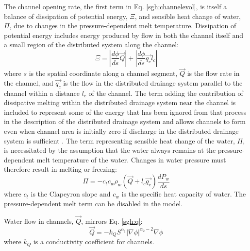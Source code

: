 The channel opening rate, the first term in Eq. \ref{sgh:channelevol}, 
is itself a balance of dissipation of potential energy, $\Xi$, 
and sensible heat change of water, $\Pi$, due to changes in the pressure-dependent melt temperature.
Dissipation of potential energy includes energy produced by flow in both the channel itself 
and a small region of the distributed system along the channel:
\begin{equation}
   \Xi = \left| \frac{d\phi}{ds}\vec{Q} \right|  +  \left| \frac{d\phi}{ds}\vec{q_c} l_c \right| 
\label{sgh:channeldissip}
\end{equation}
where $s$ is the spatial coordinate along a channel segment, 
$\vec{Q}$ is the flow rate in the channel, and
$\vec{q_c}$ is the flow in the distributed drainage system parallel to the channel
within a distance $l_c$ of the channel.
The term adding the contribution of dissipative melting within the distributed drainage system
near the channel is included to represent some of the energy that has been ignored from that process 
in the description of the distributed drainage system 
and allows channels to form even when channel area is initially zero 
if discharge in the distributed drainage system is sufficient \citep{Werder2013}.
The term representing sensible heat change of the water, $\Pi$, is necessitated by the 
assumption that the water always remains at the pressure-dependent melt temperature
of the water.
Changes in water pressure must therefore result in melting or freezing:
\begin{equation}
   \Pi = -c_t c_w \rho_w \left(\vec{Q} + l_c \vec{q_c} \right) \frac{d P_w}{d s} 
\label{sgh:channelfreeze}
\end{equation}
where $c_t$ is the Clapeyron slope and $c_w$ is the specific heat capacity of water.
The pressure-dependent melt term can be disabled in the model.

Water flow in channels, $\vec{Q}$, mirrors Eq. \ref{sgh:q}:
\begin{equation}
   \vec{Q} = -k_Q S^{\alpha_1} |\nabla \phi|^{\alpha_2-2} \nabla \phi 
\label{sgh:Q}
\end{equation}
where $k_Q$ is a conductivity coefficient for channels. 


